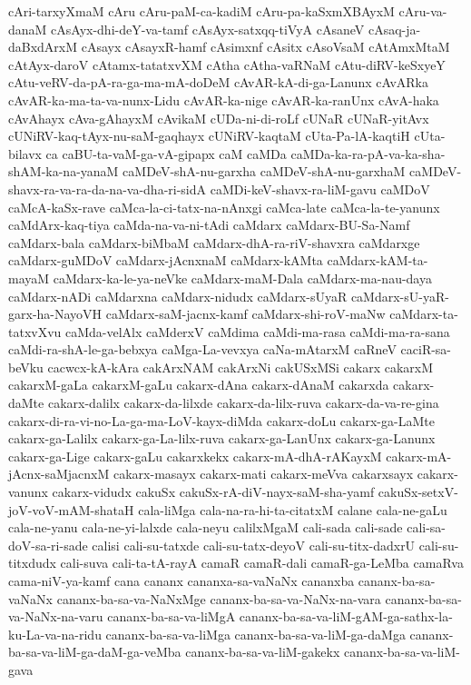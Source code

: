 {cAri-tarxyXmaM
cAru
cAru-paM-ca-kadiM
cAru-pa-kaSxmXBAyxM
cAru-va-danaM
cAsAyx-dhi-deY-va-tamf
cAsAyx-satxqq-tiVyA
cAsaneV
cAsaq-ja-daBxdArxM
cAsayx
cAsayxR-hamf
cAsimxnf
cAsitx
cAsoVsaM
cAtAmxMtaM
cAtAyx-daroV
cAtamx-tatatxvXM
cAtha
cAtha-vaRNaM
cAtu-diRV-keSxyeY
cAtu-veRV-da-pA-ra-ga-ma-mA-doDeM
cAvAR-kA-di-ga-Lanunx
cAvARka
cAvAR-ka-ma-ta-va-nunx-Lidu
cAvAR-ka-nige
cAvAR-ka-ranUnx
cAvA-haka
cAvAhayx
cAva-gAhayxM
cAvikaM
cUDa-ni-di-roLf
cUNaR
cUNaR-yitAvx
cUNiRV-kaq-tAyx-nu-saM-gaqhayx
cUNiRV-kaqtaM
cUta-Pa-lA-kaqtiH
cUta-bilavx
ca
caBU-ta-vaM-ga-vA-gipapx
caM
caMDa
caMDa-ka-ra-pA-va-ka-sha-shAM-ka-na-yanaM
caMDeV-shA-nu-garxha
caMDeV-shA-nu-garxhaM
caMDeV-shavx-ra-va-ra-da-na-va-dha-ri-sidA
caMDi-keV-shavx-ra-liM-gavu
caMDoV
caMcA-kaSx-rave
caMca-la-ci-tatx-na-nAnxgi
caMca-late
caMca-la-te-yanunx
caMdArx-kaq-tiya
caMda-na-va-ni-tAdi
caMdarx
caMdarx-BU-Sa-Namf
caMdarx-bala
caMdarx-biMbaM
caMdarx-dhA-ra-riV-shavxra
caMdarxge
caMdarx-guMDoV
caMdarx-jAcnxnaM
caMdarx-kAMta
caMdarx-kAM-ta-mayaM
caMdarx-ka-le-ya-neVke
caMdarx-maM-Dala
caMdarx-ma-nau-daya
caMdarx-nADi
caMdarxna
caMdarx-nidudx
caMdarx-sUyaR
caMdarx-sU-yaR-garx-ha-NayoVH
caMdarx-saM-jacnx-kamf
caMdarx-shi-roV-maNw
caMdarx-ta-tatxvXvu
caMda-velAlx
caMderxV
caMdima
caMdi-ma-rasa
caMdi-ma-ra-sana
caMdi-ra-shA-le-ga-bebxya
caMga-La-vevxya
caNa-mAtarxM
caRneV
caciR-sa-beVku
cacwcx-kA-kAra
cakArxNAM
cakArxNi
cakUSxMSi
cakarx
cakarxM
cakarxM-gaLa
cakarxM-gaLu
cakarx-dAna
cakarx-dAnaM
cakarxda
cakarx-daMte
cakarx-dalilx
cakarx-da-lilxde
cakarx-da-lilx-ruva
cakarx-da-va-re-gina
cakarx-di-ra-vi-no-La-ga-ma-LoV-kayx-diMda
cakarx-doLu
cakarx-ga-LaMte
cakarx-ga-Lalilx
cakarx-ga-La-lilx-ruva
cakarx-ga-LanUnx
cakarx-ga-Lanunx
cakarx-ga-Lige
cakarx-gaLu
cakarxkekx
cakarx-mA-dhA-rAKayxM
cakarx-mA-jAcnx-saMjacnxM
cakarx-masayx
cakarx-mati
cakarx-meVva
cakarxsayx
cakarx-vanunx
cakarx-vidudx
cakuSx
cakuSx-rA-diV-nayx-saM-sha-yamf
cakuSx-setxV-joV-voV-mAM-shataH
cala-liMga
cala-na-ra-hi-ta-citatxM
calane
cala-ne-gaLu
cala-ne-yanu
cala-ne-yi-lalxde
cala-neyu
calilxMgaM
cali-sada
cali-sade
cali-sa-doV-sa-ri-sade
calisi
cali-su-tatxde
cali-su-tatx-deyoV
cali-su-titx-dadxrU
cali-su-titxdudx
cali-suva
cali-ta-tA-rayA
camaR
camaR-dali
camaR-ga-LeMba
camaRva
cama-niV-ya-kamf
cana
cananx
cananxa-sa-vaNaNx
cananxba
cananx-ba-sa-vaNaNx
cananx-ba-sa-va-NaNxMge
cananx-ba-sa-va-NaNx-na-vara
cananx-ba-sa-va-NaNx-na-varu
cananx-ba-sa-va-liMgA
cananx-ba-sa-va-liM-gAM-ga-sathx-la-ku-La-va-na-ridu
cananx-ba-sa-va-liMga
cananx-ba-sa-va-liM-ga-daMga
cananx-ba-sa-va-liM-ga-daM-ga-veMba
cananx-ba-sa-va-liM-gakekx
cananx-ba-sa-va-liM-gava
}

